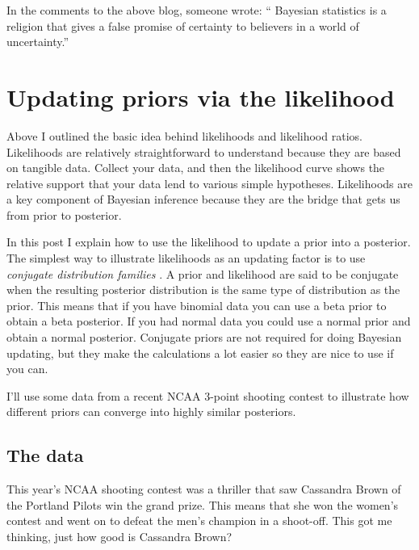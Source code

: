 In the comments to the above blog, someone wrote:
`` Bayesian statistics is a religion that gives a false promise of certainty to believers in a world of uncertainty.''



\section{Updating priors via the likelihood}
\label{sec:Updatingpriorsviathelikelihood}

Above I outlined the basic idea behind likelihoods and likelihood ratios. Likelihoods are relatively straightforward to understand because they are based on tangible data. Collect your data, and then the likelihood curve shows the relative support that your data lend to various simple hypotheses. Likelihoods are a key component of Bayesian inference because they are the bridge that gets us from prior to posterior.

In this post I explain how to use the likelihood to update a prior into a posterior. The simplest way to illustrate likelihoods as an updating factor is to use \textit{conjugate distribution families} \cite{Raiffa2000}. A prior and likelihood are said to be conjugate when the resulting posterior distribution is the same type of distribution as the prior. This means that if you have binomial data you can use a beta prior to obtain a beta posterior. If you had normal data you could use a normal prior and obtain a normal posterior. Conjugate priors are not required for doing Bayesian updating, but they make the calculations a lot easier so they are nice to use if you can.

I'll use some data from a recent NCAA 3-point shooting contest to illustrate how different priors can converge into highly similar posteriors.

\subsection{The data}

This year's NCAA shooting contest was a thriller that saw Cassandra Brown of the Portland Pilots win the grand prize. This means that she won the women's contest and went on to defeat the men's champion in a shoot-off. This got me thinking, just how good is Cassandra Brown?

